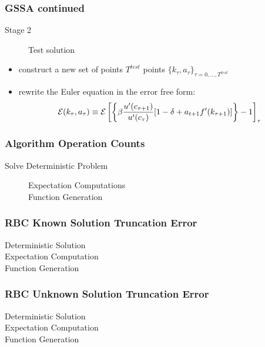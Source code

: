 \documentclass[tikz]{beamer}
\begin{document}
 \begin{frame}
   \frametitle{GSSA continued}

{\small
   \begin{description}
\item[Stage 2]  Test solution
   \end{description}
   \begin{itemize}
\item construct a new set of points $T^{test}$ points $\{k_\tau,a_\tau\}_{\tau=0, \ldots, T^{test}}$
    \item rewrite the Euler equation in the error free form:
      \begin{gather}
        \mathcal{E}(k_\tau,a_\tau)\equiv {\mathcal{E}\left [ 
{\left \{ \beta \frac{u^\prime(c_{\tau+1})}{u^\prime(c_{\tau})} [1- \delta + a_{t+1}f^\prime(k_{\tau+1})] \right \} -1}\right ]}_\tau 
      \end{gather}
   \end{itemize}
}
 \end{frame}

\begin{frame}
  \frametitle{Algorithm Operation Counts}
  \begin{description}
  \item[Solve Deterministic Problem]
    \begin{description}
    \item[Expectation Computations] 
    \item[Function Generation] 
    \end{description}
  \end{description}
\end{frame}



\begin{frame}
  \frametitle{RBC Known Solution Truncation Error }
  \begin{description}
  \item[Deterministic Solution] 
  \item[Expectation Computation] 
\item[Function Generation]
  \end{description}

\end{frame}


\begin{frame}
  \frametitle{RBC Unknown Solution Truncation Error }
  \begin{description}
  \item[Deterministic Solution] 
  \item[Expectation Computation] 
\item[Function Generation]
  \end{description}

\end{frame}
\end{document}
